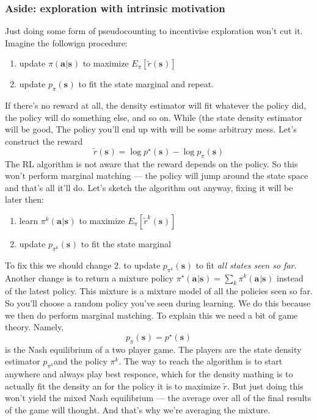 \documentclass{report}
\begin{document}
\subsubsection{Aside: exploration with intrinsic motivation}
Just doing some form of pseudocounting to incentivise exploration won't cut it.
Imagine the followign procedure:
\begin{enumerate}
		\item update $ \pi(\bm{a}_{}|\bm{s}_{})  $ to maximize $ E_\pi \left[ \tilde{r}(\bm{s}_{}) \right]   $
		\item update $ p_\pi(\bm{s}_{})  $ to fit the state marginal and repeat.
\end{enumerate}
If there's no reward at all, the density estimator will fit whatever the policy did,
the policy will do something else, and so on.
While (the state density estimator will be good,
The policy you'll end up with will be some arbitrary mess.
Let's construct the reward
\begin{equation}
		\tilde{r}(\bm{s}_{}) = \log p^\star (\bm{s}_{}) - \log p_\pi (\bm{s}_{})
\end{equation}
The RL algorithm is not aware that the reward depends on the policy.
So this won't perform marginal matching --- 
the policy will jump around the state space and that's all it'll do.
Let's sketch the algorithm out anyway, fixing it will be later then:
\begin{enumerate}
		\item learn $ \pi^k (\bm{a}_{}|\bm{s}_{})  $ to maximize $ E_\pi \left[ \tilde{r}^k(\bm{s}_{}) \right]   $
		\item update $ p_{\pi^k}(\bm{s}_{})  $ to fit the state marginal
\end{enumerate}
To fix this we should change 2. to
update $ p_{\pi^k}(\bm{s}_{})  $ to fit \textit{all states seen so far}.
Another change is to return a mixture policy $ \pi^\star (\bm{a}_{}|\bm{s}_{})  = \sum_{k}^{} \pi^k(\bm{a}_{}|\bm{s}_{}) $
instead of the latest policy.
This mixture is a mixture model of all the policies seen so far.
So you'll choose a random policy you've seen during learning.
We do this because we then do perform marginal matching.
To explain this we need a bit of game theory.
Namely,
\begin{equation}
		p_\pi(\bm{s}_{}) = p^\star (\bm{s}_{}) 
\end{equation}
is the Nash equilibrium of a two player game.
The players are the state density estimator $ p_{\pi^k}  $and the policy $\pi^k$.
The way to reach the algorithm is to start anywhere and always play best responce,
which for the density mathing is to actually fit the density an for the policy
it is to maximize $ \tilde{r}  $.
But just doing this won't yield the mixed Nash equilibrium --- the average over all
of the final results of the game will thought.
And that's why we're averaging the mixture.
\end{document}
